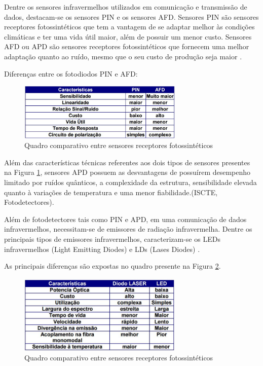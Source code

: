 Dentre os sensores infravermelhos utilizados em comunicação e transmissão de dados, destacam-se os sensores PIN e os sensores AFD. Sensores PIN são sensores receptores fotossintéticos que tem a vantagem de se adaptar melhor às condições climáticas e ter uma vida útil maior, além de possuir um menor custo. Sensores AFD ou APD são sensores receptores fotossintéticos que fornecem uma melhor adaptação quanto ao ruído, mesmo que o seu custo de produção seja maior \cite{jose2002sistema}.

Diferenças entre os fotodiodos PIN e AFD:
\begin{figure}[!h]
	\centering
	\includegraphics[width=0.7\textwidth]{figuras/tabelaSensorFotossintetico.png}
	\caption{Quadro comparativo entre sensores receptores fotossintéticos}
	\label{fig:sensorfotossintetico}
\end{figure}

Além das características técnicas referentes aos dois tipos de sensores presentes na Figura \ref{fig:sensorfotossintetico}, sensores APD possuem as desvantagens de  possuírem desempenho limitado por ruídos quânticos, a complexidade da estrutura, sensibilidade elevada quanto à variações de temperatura e uma menor fiabilidade.(ISCTE, Fotodetectores).

Além de fotodetectores tais como PIN e APD, em uma comunicação de dados infravermelhos, necessitam-se de emissores de radiação infravermelha. Dentre os principais tipos de emissores infravermelhos, caracterizam-se os LEDs infravermelhos (Light Emitting Diodes) e LDs (Lases Diodes) \cite{jose2002sistema}.

As principais diferenças são expostas no quadro presente na Figura \ref{fig:sensorinfravermelho}.
\begin{figure}[!h]
	\centering
	\includegraphics[width=0.7\textwidth]{figuras/tabelaSensorInfravermelho.png}
	\caption{Quadro comparativo entre sensores receptores fotossintéticos}
	\label{fig:sensorinfravermelho}
\end{figure}

